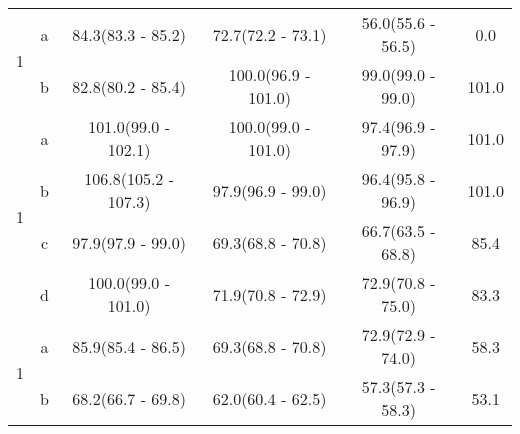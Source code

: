 \begin{table}[H]
\begin{tabular}{c|c|c|c|c|c}
\multirow{2}{*}{1} & a & 84.3(83.3 - 85.2) & 72.7(72.2 - 73.1) & 56.0(55.6 - 56.5) & 0.0\\ 
 & b & 82.8(80.2 - 85.4) & 100.0(96.9 - 101.0) & 99.0(99.0 - 99.0) & 101.0\\ 
\hline

\multirow{4}{*}{1} & a & 101.0(99.0 - 102.1) & 100.0(99.0 - 101.0) & 97.4(96.9 - 97.9) & 101.0\\ 
 & b & 106.8(105.2 - 107.3) & 97.9(96.9 - 99.0) & 96.4(95.8 - 96.9) & 101.0\\ 
 & c & 97.9(97.9 - 99.0) & 69.3(68.8 - 70.8) & 66.7(63.5 - 68.8) & 85.4\\ 
 & d & 100.0(99.0 - 101.0) & 71.9(70.8 - 72.9) & 72.9(70.8 - 75.0) & 83.3\\ 
\hline

\multirow{2}{*}{1} & a & 85.9(85.4 - 86.5) & 69.3(68.8 - 70.8) & 72.9(72.9 - 74.0) & 58.3\\ 
 & b & 68.2(66.7 - 69.8) & 62.0(60.4 - 62.5) & 57.3(57.3 - 58.3) & 53.1\\ 
\hline
		

		
		\hline
	\end{tabular}
	\label{tab:resultsComplex2}
\end{table}